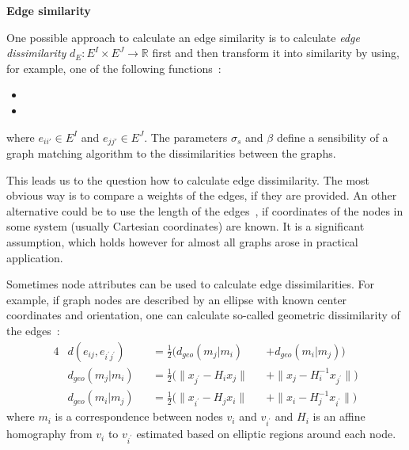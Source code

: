 \textbf{Edge similarity}

One possible approach to calculate an edge similarity is to calculate \emph{edge dissimilarity} $d_E:E^I\times E^J\rightarrow\mathbb{R}$ first and then transform it into similarity by using, for example, one of the following functions~\cite{Cho2014_Haystack, Cho2009_AgglClustering, Cho2010_RRWM,Cho2012_ProgressiveGM}:
\begin{itemize}
	\item {}
	\item {}
\end{itemize}
where $e_{ii\prime}\in E^I$ and $e_{jj\prime}\in E^J$. The parameters $\sigma_s$ and $\beta$ define a sensibility of a graph matching algorithm to the dissimilarities between the graphs.

This leads us to the question how to calculate edge dissimilarity. The most obvious way is to compare a weights of the edges, if they are provided. An other alternative could be to use the length of the edges~\cite{Cho2014_Haystack, Cho2009_AgglClustering, Cho2010_RRWM,Cho2012_ProgressiveGM}, if coordinates of the nodes in some system (usually Cartesian coordinates) are known. It is a significant assumption, which holds however for almost all graphs arose in practical application.

Sometimes node attributes can be used to calculate edge dissimilarities. For example, if graph nodes are described by an ellipse with known center coordinates and orientation, one can calculate so-called geometric dissimilarity of the edges~\cite{Cho2009_AgglClustering,Cho2012_ProgressiveGM}:
\begin{alignat}{4}\label{eq:geomDiss}
& d(e_{ij},e_{i^\prime j^\prime}) && =\frac{1}{2}(d_{geo}(m_j|m_i) && +d_{geo}(m_i|m_j)) \\
& d_{geo}(m_j|m_i) && =\frac{1}{2}(\|x_{j^\prime}-H_{i}x_j\| && + \|x_{j}-H^{-1}_ix_{j^\prime}\|) \\
& d_{geo}(m_i|m_j) && =\frac{1}{2}(\|x_{i^\prime}-H_{j}x_i\| && + \|x_{i}-H^{-1}_{j}x_{i^\prime}\|) 
\end{alignat}
where $m_i$ is a correspondence between nodes $v_i$ and $v_{i^\prime}$ and $H_i$ is an affine homography from $v_i$ to $v_{i^\prime}$ estimated based on elliptic regions around each node.

